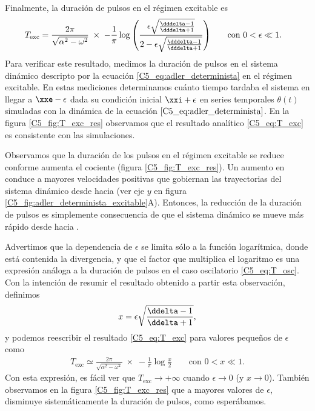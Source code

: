{\begin{align}
\end{align}
Finalmente, la duración de pulsos en el régimen excitable es
\begin{align}
T_{\text{exc}} &=\frac{2\pi}{\sqrt{\alpha^2 - \omega^2}} \; \times \; -\frac{1}{\pi}  \log{\left( \frac{\epsilon \sqrt{\frac{\dddelta - 1}{\dddelta + 1}}}{2-\epsilon \sqrt{\frac{\dddelta - 1}{\dddelta + 1}}}\right)} \qquad \text{con } 0<\epsilon \ll 1.
    \label{C5_eq:T_exc}
\end{align}
Para verificar este resultado, medimos la duración de pulsos en el sistema dinámico descripto por la ecuación \ref{C5_eq:adler_determinista} en el régimen excitable. En estas mediciones determinamos cuánto tiempo tardaba el sistema en llegar a $\xxe-\epsilon$ dada su condición inicial $\xxi+\epsilon$ en series temporales $\theta(t)$ simuladas con la dinámica de la ecuación $\ref{C5_eq:adler_determinista}$. En la figura \ref{C5_fig:T_exc_res} observamos que el resultado analítico \ref{C5_eq:T_exc} es consistente con las simulaciones. 


Observamos que la duración de los pulsos en el régimen excitable se reduce conforme aumenta el cociente \ddelta (figura \ref{C5_fig:T_exc_res}). Un aumento en \ddelta conduce a mayores velocidades positivas que gobiernan las trayectorias del sistema dinámico desde \xxi hacia \xxe (ver eje $y$ en figura \ref{C5_fig:adler_determinista_excitable}A). Entonces, la reducción de la duración de pulsos es simplemente consecuencia de que el sistema dinámico se mueve más rápido desde \xxi hacia \xxe.  

Advertimos que la dependencia de $\epsilon$ se limita sólo a la función logarítmica, donde está contenida la divergencia, y que el factor que multiplica el logaritmo es una expresión análoga a la duración de pulsos en el caso oscilatorio \ref{C5_eq:T_osc}. Con la intención de resumir el resultado obtenido a partir esta observación, definimos 
\begin{equation}
    x = \epsilon \sqrt{\frac{\ddelta - 1}{\ddelta + 1}},
\end{equation}
y podemos reescribir el resultado \ref{C5_eq:T_exc} para valores pequeños de $\epsilon$ como
\begin{align}
    T_{\text{exc}} \simeq \frac{2\pi}{\sqrt{\alpha^2 - \omega^2}} \; \times \; -\frac{1}{\pi}  \log{\frac{x}{2}} \qquad \text{con } 0<x \ll 1.
    \label{C5_eq:T_exc_aprox}
\end{align}
Con esta expresión, es fácil ver que $T_{\text{exc}} \rightarrow +\infty$ cuando $\epsilon \rightarrow 0$ (y $x \rightarrow 0$). También observamos en la figura \ref{C5_fig:T_exc_res} que a mayores valores de $\epsilon$, disminuye sistemáticamente la duración de pulsos, como esperábamos.

}
